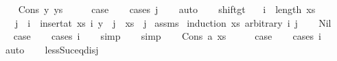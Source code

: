 \begin{isabellebody}
\isanewline
\ \ \isamarkupfalse%
\ {\isacharparenleft}{\kern0pt}Cons\ y\ ys{\isacharparenright}{\kern0pt}\isanewline
\ \ \isamarkupfalse%
\ \isamarkupfalse%
\ {\isacharquery}{\kern0pt}case\isanewline
\ \ \isamarkupfalse%
\ {\isacharparenleft}{\kern0pt}cases\ j{\isacharparenright}{\kern0pt}\isanewline
\ \ \isamarkupfalse%
\ auto\isanewline
\ \ \isamarkupfalse%
\isanewline
{}\isamarkupfalse%
%
\endisatagproof
{\isafoldproof}%
%
\isadelimproof
\isanewline
%
\endisadelimproof
\isanewline
\isanewline
\isanewline
{}\isamarkupfalse%
\ shift{\isacharunderscore}{\kern0pt}gt{\isacharcolon}{\kern0pt}\isanewline
\ \ \ {\isachardoublequoteopen}i\ {\isasymle}\ length\ xs{\isachardoublequoteclose}\isanewline
\ \ \ {\isachardoublequoteopen}j\ {\isacharless}{\kern0pt}\ i\ {\isasymLongrightarrow}\ {\isacharparenleft}{\kern0pt}insert{\isacharunderscore}{\kern0pt}at\ xs\ i\ y{\isacharparenright}{\kern0pt}\ {\isacharbang}{\kern0pt}\ j\ {\isacharequal}{\kern0pt}\ xs\ {\isacharbang}{\kern0pt}\ j{\isachardoublequoteclose}\isanewline
%
\isadelimproof
%
\endisadelimproof
%
\isatagproof
{}\isamarkupfalse%
\ assms\isanewline
{}\isamarkupfalse%
\ {\isacharparenleft}{\kern0pt}induction\ xs\ arbitrary{\isacharcolon}{\kern0pt}\ i\ j{\isacharparenright}{\kern0pt}\isanewline
\ \ \isamarkupfalse%
\ Nil\isanewline
\ \ \isamarkupfalse%
\ \isamarkupfalse%
\ {\isacharquery}{\kern0pt}case\isanewline
\ \ \isamarkupfalse%
\ {\isacharparenleft}{\kern0pt}cases\ i{\isacharparenright}{\kern0pt}\isanewline
\ \ \isamarkupfalse%
\ simp\isanewline
\ \ \isamarkupfalse%
\ simp\isanewline
{}\isamarkupfalse%
\isanewline
\ \ \isamarkupfalse%
\ {\isacharparenleft}{\kern0pt}Cons\ a\ xs{\isacharparenright}{\kern0pt}\isanewline
\ \ \isamarkupfalse%
\ \isamarkupfalse%
\ {\isacharquery}{\kern0pt}case\isanewline
\ \ \isamarkupfalse%
\ {\isacharparenleft}{\kern0pt}cases\ i{\isacharparenright}{\kern0pt}\isanewline
\ \ \isamarkupfalse%
\ auto\isanewline
\ \ \isamarkupfalse%
\ less{\isacharunderscore}{\kern0pt}Suc{\isacharunderscore}{\kern0pt}eq{\isacharunderscore}{\kern0pt}{}{\isacharunderscore}{\kern0pt}disj\ \isamarkupfalse%

\end{isabellebody}
